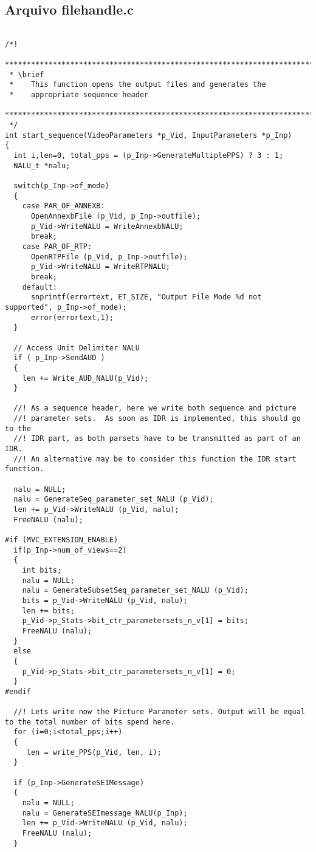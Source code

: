 \subsection{Arquivo filehandle.c}
\begin{lstlisting}

/*!
 ************************************************************************
 * \brief
 *    This function opens the output files and generates the
 *    appropriate sequence header
 ************************************************************************
 */
int start_sequence(VideoParameters *p_Vid, InputParameters *p_Inp)
{
  int i,len=0, total_pps = (p_Inp->GenerateMultiplePPS) ? 3 : 1;
  NALU_t *nalu;

  switch(p_Inp->of_mode)
  {
    case PAR_OF_ANNEXB:
      OpenAnnexbFile (p_Vid, p_Inp->outfile);
      p_Vid->WriteNALU = WriteAnnexbNALU;
      break;
    case PAR_OF_RTP:
      OpenRTPFile (p_Vid, p_Inp->outfile);
      p_Vid->WriteNALU = WriteRTPNALU;
      break;
    default:
      snprintf(errortext, ET_SIZE, "Output File Mode %d not supported", p_Inp->of_mode);
      error(errortext,1);
  }

  // Access Unit Delimiter NALU
  if ( p_Inp->SendAUD )
  {
    len += Write_AUD_NALU(p_Vid);
  }

  //! As a sequence header, here we write both sequence and picture
  //! parameter sets.  As soon as IDR is implemented, this should go to the
  //! IDR part, as both parsets have to be transmitted as part of an IDR.
  //! An alternative may be to consider this function the IDR start function.

  nalu = NULL;
  nalu = GenerateSeq_parameter_set_NALU (p_Vid);
  len += p_Vid->WriteNALU (p_Vid, nalu);
  FreeNALU (nalu);

#if (MVC_EXTENSION_ENABLE)
  if(p_Inp->num_of_views==2)
  {
    int bits;
    nalu = NULL;
    nalu = GenerateSubsetSeq_parameter_set_NALU (p_Vid);
    bits = p_Vid->WriteNALU (p_Vid, nalu);
    len += bits;
    p_Vid->p_Stats->bit_ctr_parametersets_n_v[1] = bits;
    FreeNALU (nalu);
  }
  else
  {
    p_Vid->p_Stats->bit_ctr_parametersets_n_v[1] = 0;
  }
#endif

  //! Lets write now the Picture Parameter sets. Output will be equal to the total number of bits spend here.
  for (i=0;i<total_pps;i++)
  {
     len = write_PPS(p_Vid, len, i);
  }

  if (p_Inp->GenerateSEIMessage)
  {
    nalu = NULL;
    nalu = GenerateSEImessage_NALU(p_Inp);
    len += p_Vid->WriteNALU (p_Vid, nalu);
    FreeNALU (nalu);
  }


\end{lstlisting}
